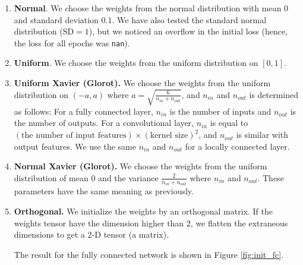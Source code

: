 \documentclass[
	12pt, %
]{../Template/fphw}
\begin{document}
\begin{enumerate}[label = (\arabic*)]
\begin{enumerate}
        \item \textbf{Normal}. We choose the weights from the normal distribution with mean $0$ and standard deviation $0.1$. We have also tested the standard normal distribution ($\textrm{SD}=1$), but we noticed an overflow in the initial loss (hence, the loss for all epochs was \verb|nan|).
        \item \textbf{Uniform}. We choose the weights from the uniform distribution on $[0,1]$.
        \item \textbf{Uniform Xavier (Glorot).} We choose the weights from the uniform distribution on $(-a,a)$ where $a = \sqrt{\frac{6}{n_{in}+n_{out}}}$, and $n_{in}$ and $n_{out}$ is determined as follows: For a fully connected layer, $n_{in}$ is the number of inputs and $n_{out}$ is the number of outputs. For a convolutional layer, $n_{in}$ is equal to $(\textrm{the number of input features})\times (\textrm{kernel size})^2$, and $n_{out}$ is similar with output features. We use the same $n_{in}$ and $n_{out}$ for a locally connected layer.
    \item \textbf{Normal Xavier (Glorot).} We choose the weights from the uniform distribution of mean $0$ and the variance $\frac{2}{n_{in}+n_{out}}$ where $n_{in}$ and $n_{out}$. These parameters have the same meaning as previously.
    \item \textbf{Orthogonal.} We initialize the weights by an orthogonal matrix. If the weights tensor have the dimension higher than $2$, we flatten the extraneous dimensions to get a $2$-D tensor (a matrix).
    
    The result for the fully connected network is shown in Figure \ref{fig:init_fc}.
    \end{enumerate}


\end{enumerate}
\end{document}
